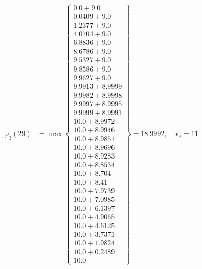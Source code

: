 \documentclass{article}
\begin{document}
\begin{align*}
  
\varphi_{3}(29) &= \max \left\{ \begin{array}{c}
0.0 + 9.0 \\
 0.0409 + 9.0 \\
 1.2377 + 9.0 \\
 4.0704 + 9.0 \\
 6.8836 + 9.0 \\
 8.6786 + 9.0 \\
 9.5327 + 9.0 \\
 9.8586 + 9.0 \\
 9.9627 + 9.0 \\
 9.9913 + 8.9999 \\
 9.9982 + 8.9998 \\
 9.9997 + 8.9995 \\
 9.9999 + 8.9991 \\
 10.0 + 8.9972 \\
 10.0 + 8.9946 \\
 10.0 + 8.9851 \\
 10.0 + 8.9696 \\
 10.0 + 8.9283 \\
 10.0 + 8.8534 \\
 10.0 + 8.704 \\
 10.0 + 8.41 \\
 10.0 + 7.9739 \\
 10.0 + 7.0985 \\
 10.0 + 6.1397 \\
 10.0 + 4.9065 \\
 10.0 + 4.6125 \\
 10.0 + 3.7371 \\
 10.0 + 1.9824 \\
 10.0 + 0.2489 \\
 10.0
\end{array} \right\}=18.9992,\quad x_{3}^0=11\\
  
  
  

\end{align*}
\end{document}
